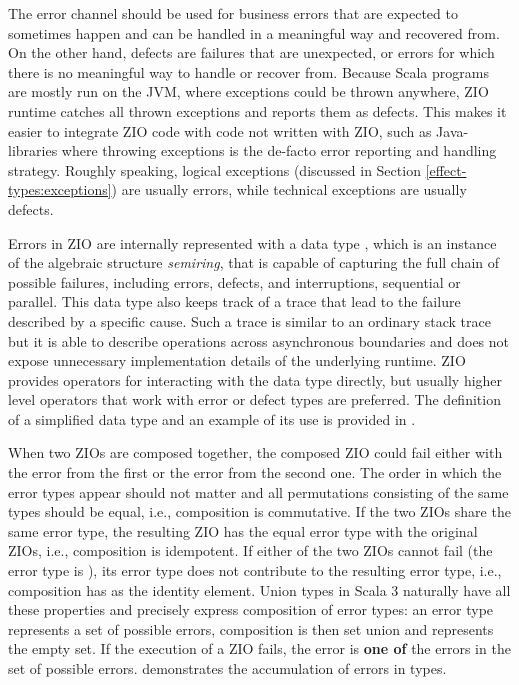 The error channel should be used for business errors that are expected to sometimes happen and can be handled in a meaningful way and recovered from. On the other hand, defects are failures that are unexpected, or errors for which there is no meaningful way to handle or recover from. Because Scala programs are mostly run on the JVM, where exceptions could be thrown anywhere, ZIO runtime catches all thrown exceptions and reports them as defects. This makes it easier to integrate ZIO code with code not written with ZIO, such as Java-libraries where throwing exceptions is the de-facto error reporting and handling strategy. Roughly speaking, logical exceptions (discussed in Section \ref{effect-types:exceptions}) are usually errors, while technical exceptions are usually defects.

Errors in ZIO are internally represented with a data type , which is an instance of the algebraic structure \emph{semiring}, that is capable of capturing the full chain of possible failures, including errors, defects, and interruptions, sequential or parallel. This data type also keeps track of a trace that lead to the failure described by a specific cause. Such a trace is similar to an ordinary stack trace but it is able to describe operations across asynchronous boundaries and does not expose unnecessary implementation details of the underlying runtime. ZIO provides operators for interacting with the  data type directly, but usually higher level operators that work with error or defect types are preferred. The definition of a simplified  data type and an example of its use is provided in .



When two ZIOs are composed together, the composed ZIO could fail either with the error from the first or the error from the second one. The order in which the error types appear should not matter and all permutations consisting of the same types should be equal, i.e., composition is commutative. If the two ZIOs share the same error type, the resulting ZIO has the equal error type with the original ZIOs, i.e., composition is idempotent. If either of the two ZIOs cannot fail (the error type is ), its error type does not contribute to the resulting error type, i.e., composition has  as the identity element. Union types in Scala 3 naturally have all these properties and precisely express composition of error types: an error type represents a set of possible errors, composition is then set union and  represents the empty set. If the execution of a ZIO fails, the error is \textbf{one of} the errors in the set of possible errors.  demonstrates the accumulation of errors in types.

